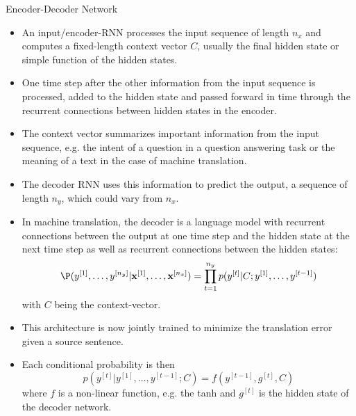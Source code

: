 \begin{vbframe}{Encoder-Decoder Network}
\begin{itemize}
    \item An input/encoder-RNN processes the input sequence of length $n_x$ and computes a fixed-length context vector $C$, usually the final hidden state or  simple function of the hidden states.
    \item One time step after the other information from the input sequence is processed, added to the hidden state and passed forward in time through the recurrent connections between hidden states in the encoder.
    \item  The context vector summarizes important information from the input sequence, e.g. the intent of a question in a question answering task or the meaning of a text in the case of machine translation.
    \item The decoder RNN uses this information to predict the output, a sequence of length $n_y$, which could vary from $n_x$. 
    \item In machine translation, the decoder is a language model with recurrent connections between the output at one time step and the hidden state at the next time step as well as recurrent connections between the hidden states:
    $$\P(y^{[1]}, \dots, y^{[n_y]}|\textbf{x}^{[1]},  \dots, \textbf{x}^{[n_x]}) = \displaystyle \prod_{t=1}^{n_y} p(y^{[t]}|C; y^{[1]}, \dots, y^{[t-1]})$$ with $C$ being the context-vector.
    \item This architecture is now jointly trained to minimize the translation
error given a source sentence.
    \item Each conditional probability is then $$p(y^{[t]}|y^{[1]}, \dots, y^{[t-1]};C) = f(y^{[t-1]}, g^{[t]}, C)$$ where $f$ is a non-linear function, e.g. the tanh and $g^{[t]}$ is the hidden state of the decoder network.
  \end{itemize}
\end{vbframe}





